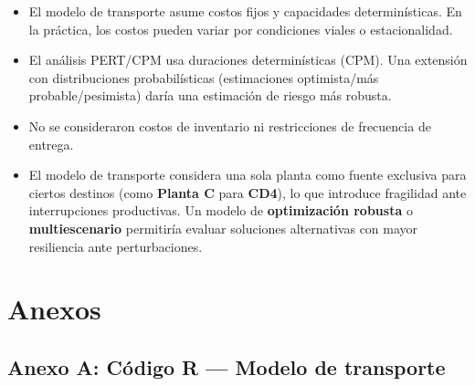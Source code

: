 \documentclass[12pt,a4paper]{article}
\begin{document}
\begin{itemize}
  \item El modelo de transporte asume costos fijos y capacidades determin\'{i}sticas.
  En la pr\'{a}ctica, los costos pueden variar por condiciones viales o estacionalidad.
  \item El an\'{a}lisis PERT/CPM usa duraciones determin\'{i}sticas (CPM). Una extensi\'{o}n
  con distribuciones probabil\'{i}sticas (estimaciones optimista/m\'{a}s probable/pesimista)
  dar\'{i}a una estimaci\'{o}n de riesgo m\'{a}s robusta.
  \item No se consideraron costos de inventario ni restricciones de frecuencia de entrega.
  \item El modelo de transporte considera una sola planta como fuente exclusiva para ciertos 
  destinos (como \textbf{Planta C} para \textbf{CD4}), lo que introduce fragilidad ante 
  interrupciones productivas. Un modelo de \textbf{optimizaci\'{o}n 
  robusta} o \textbf{multiescenario} permitir\'{i}a evaluar soluciones alternativas con 
  mayor resiliencia ante perturbaciones.
\end{itemize}

\newpage

\section*{Anexos}

\subsection*{Anexo A: C\'{o}digo R --- Modelo de transporte}
\end{document}
